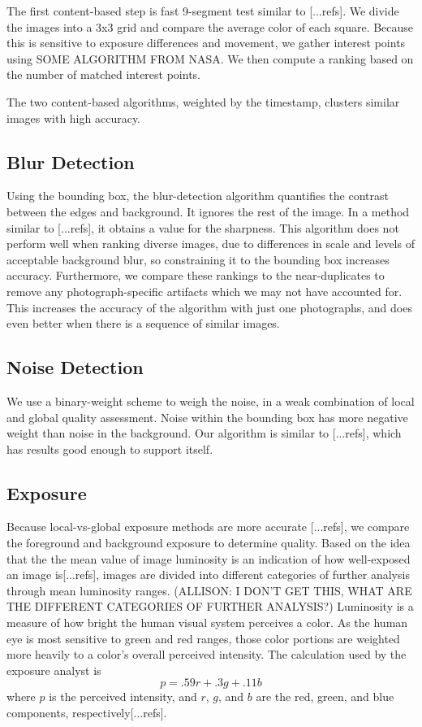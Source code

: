 \documentclass[twocolumn]{article}
\begin{document}
The first content-based step is fast 9-segment test similar to [...refs]. We divide the images into a 3x3 grid and compare the average color of each square. Because this is sensitive to exposure differences and movement, we gather interest points using SOME ALGORITHM FROM NASA. We then compute a ranking based on the number of matched interest points.

The two content-based algorithms, weighted by the timestamp, clusters similar images with high accuracy.

\subsection{Blur Detection}
Using the bounding box, the blur-detection algorithm quantifies the contrast between the edges and background. It ignores the rest of the image. In a method similar to [...refs], it obtains a value for the sharpness. This algorithm does not perform well when ranking diverse images, due to differences in scale and levels of acceptable background blur, so constraining it to the bounding box increases accuracy. Furthermore, we compare these rankings to the near-duplicates to remove any photograph-specific artifacts which we may not have accounted for. This increases the accuracy of the algorithm with just one photographs, and does even better when there is a sequence of similar images.

\subsection{Noise Detection}
We use a binary-weight scheme to weigh the noise, in a weak combination of local and global quality assessment. Noise within the bounding box has more negative weight than noise in the background. Our algorithm is similar to [...refs], which has results good enough to support itself.

\subsection{Exposure}
Because local-vs-global exposure methods are more accurate [...refs], we compare the foreground and background exposure to determine quality. Based on the idea that the the mean value of image luminosity is an indication of how well-exposed an image is[...refs], images are divided into different categories of further analysis through mean luminosity ranges. (ALLISON: I DON'T GET THIS, WHAT ARE THE DIFFERENT CATEGORIES OF FURTHER ANALYSIS?)
Luminosity is a measure of how bright the human visual system perceives a color. As the human eye is most sensitive to green and red ranges, those color portions are weighted more heavily to a color's overall perceived intensity. The calculation used by the exposure analyst is
\[
p=.59r+.3g+.11b
\]
where \(p\) is the perceived intensity, and \(r\), \(g\), and \(b\) are the red, green, and blue components, respectively[...refs].
\end{document}
